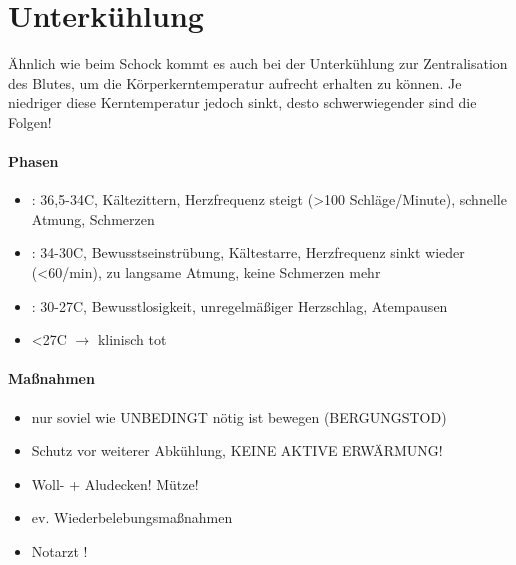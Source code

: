 \section{Unterk\"uhlung}

\"Ahnlich wie beim Schock kommt es auch  bei der Unterk\"uhlung zur
Zentralisation  des Blutes, um die  Körperkerntemperatur aufrecht
erhalten  zu können. Je niedriger diese  Kerntemperatur jedoch sinkt,
desto  schwerwiegender sind die Folgen!

\paragraph{Phasen}

\begin{itemize}
\item {\mdseries
{}:  36,5{\textdegree}-34{\textdegree}C,
Kältezittern, Herzfrequenz steigt ({\textgreater}100
Schläge/Minute), schnelle Atmung, Schmerzen}

\item {\mdseries
{}:
34{\textdegree}-30{\textdegree}C, Bewusstseinstr\"ubung, Kältestarre,
Herzfrequenz sinkt wieder ({\textless}60/min), zu langsame Atmung,
keine Schmerzen mehr}

\item {\mdseries
{}: 30{\textdegree}-27{\textdegree}C,
Bewusstlosigkeit, unregelmä{\ss}iger Herzschlag, Atempausen}

\item {\mdseries
{\textless}27{\textdegree}C ${\rightarrow}$ klinisch tot}

\end{itemize}


\begin{gMassnahmenEnv}
\paragraph{Ma{\ss}nahmen}

\begin{itemize}
    \item nur soviel wie UNBEDINGT nötig ist  bewegen (BERGUNGSTOD)
    \item Schutz vor weiterer Abk\"uhlung, KEINE AKTIVE ERW\"ARMUNG!
    \item Woll- + Aludecken! M\"utze!
    \item ev. Wiederbelebungsma{\ss}nahmen
    \item Notarzt !
\end{itemize}
\end{gMassnahmenEnv}



